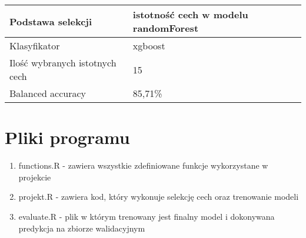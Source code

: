\documentclass{article}
\begin{document}
\begin{table}[H]
	\begin{center}
		\begin{tabular}{|l|l|}
			\hline
			Podstawa selekcji & istotność cech w modelu randomForest \\
			\hline
			Klasyfikator & xgboost \\
			\hline
			Ilość wybranych istotnych cech & 15 \\
			\hline
			Balanced accuracy & 85,71\% \\
			\hline
		\end{tabular}
	\end{center}
\end{table}

\section{Pliki programu}
\begin{enumerate}
	\item functions.R - zawiera wszystkie zdefiniowane funkcje wykorzystane w projekcie
	\item projekt.R - zawiera kod, który wykonuje selekcję cech oraz trenowanie modeli
	\item evaluate.R - plik w którym trenowany jest finalny model i dokonywana predykcja na zbiorze walidacyjnym
\end{enumerate}
\end{document}
